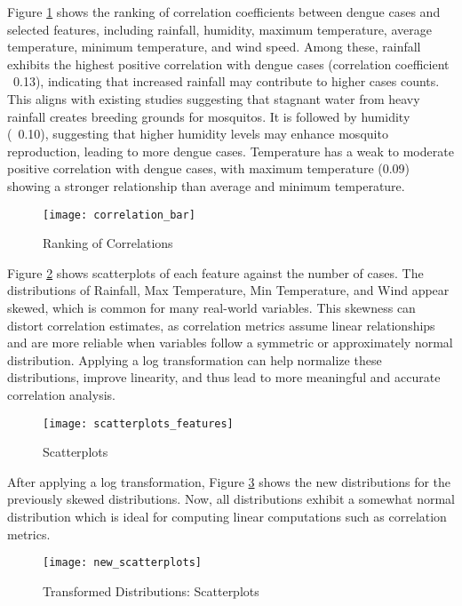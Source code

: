 Figure \ref{fig:correlation_bar} shows the ranking of correlation coefficients between dengue cases and selected features, including rainfall, humidity, maximum temperature, average temperature, minimum temperature, and wind speed. Among these, rainfall exhibits the highest positive correlation with dengue cases (correlation coefficient ~0.13), indicating that increased rainfall may contribute to higher cases counts. This aligns with existing studies suggesting that stagnant water from heavy rainfall creates breeding grounds for mosquitos. It is followed by humidity (~0.10), suggesting that higher humidity levels may enhance mosquito reproduction, leading to more dengue cases. Temperature has a weak to moderate positive correlation with dengue cases, with maximum temperature (0.09) showing a stronger relationship than average and minimum temperature. 

\begin{figure}[hbt!]
	\centering
	\texttt{[image: correlation\_bar]}
	\caption{Ranking of Correlations}
	\label{fig:correlation_bar}
\end{figure}

Figure \ref{fig:scatterplots_features} shows scatterplots of each feature against the number of cases. The distributions of Rainfall, Max Temperature, Min Temperature, and Wind appear skewed, which is common for many real-world variables. This skewness can distort correlation estimates, as correlation metrics assume linear relationships and are more reliable when variables follow a symmetric or approximately normal distribution. Applying a log transformation can help normalize these distributions, improve linearity, and thus lead to more meaningful and accurate correlation analysis. 

\begin{figure}[hbt!]
	\centering
	\texttt{[image: scatterplots\_features]}
	\caption{Scatterplots}
	\label{fig:scatterplots_features}
\end{figure}

After applying a log transformation, Figure \ref{fig:new_scatterplots} shows the new distributions for the previously skewed distributions. Now, all distributions exhibit a somewhat normal distribution which is ideal for computing linear computations such as correlation metrics.

\begin{figure}[hbt!]
	\centering
	\texttt{[image: new\_scatterplots]}
	\caption{Transformed Distributions: Scatterplots}
	\label{fig:new_scatterplots}
\end{figure}


